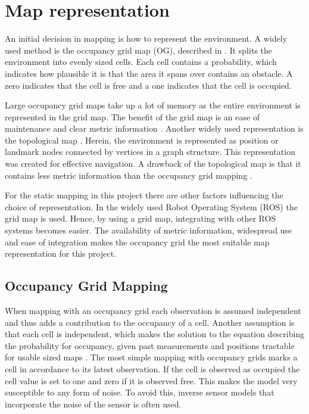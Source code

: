 \section{Map representation}
\label{sec:occupancy_grid_mapping}

An initial decision in mapping is how to represent the environment. A widely used method is the occupancy grid map (OG), described in \cite{elfesMoravecOccGrid}. It splits the environment into evenly sized cells. 
Each cell contains a probability, which indicates how plausible it is that the area it spans over contains an obstacle.
A zero indicates that the cell is free and a one indicates that the cell is occupied.


Large occupancy grid maps take up a lot of memory as the entire environment is represented in the grid map. 
The benefit of the grid map is an ease of maintenance and clear metric information \cite{mapbuildingSummary}. 
Another widely used representation is the topological map \cite{topologyOrig}. 
Herein, the environment is represented as position or landmark nodes connected by vertices in a graph structure. 
This representation was created for effective navigation. 
A drawback of the topological map is that it contains less metric information than the occupancy grid mapping \cite{mapbuildingSummary}.

For the static mapping in this project there are other factors influencing the choice of representation. In the widely used Robot Operating System (ROS)\cite{ros_info} the grid map is used. 
Hence, by using a grid map, integrating with other ROS systems becomes easier.
The availability of metric information, widespread use and ease of integration makes the occupancy grid the most suitable map representation for this project. 

\subsection{Occupancy Grid Mapping}
When mapping with an occupancy grid each observation is assumed independent and thus adds a contribution to the occupancy of a cell. 
Another assumption is that each cell is independent, which makes the solution to the equation describing the probability for occupancy, given past measurements and positions tractable for usable sized maps \cite{Merali_Patchmap}.
The most simple mapping with occupancy grids marks a cell in accordance to its latest observation. If the cell is observed as occupied the cell value is set to one and zero if it is observed free.
This makes the model very susceptible to any form of noise. 
To avoid this, inverse sensor models that incorporate the noise of the sensor is often used.


